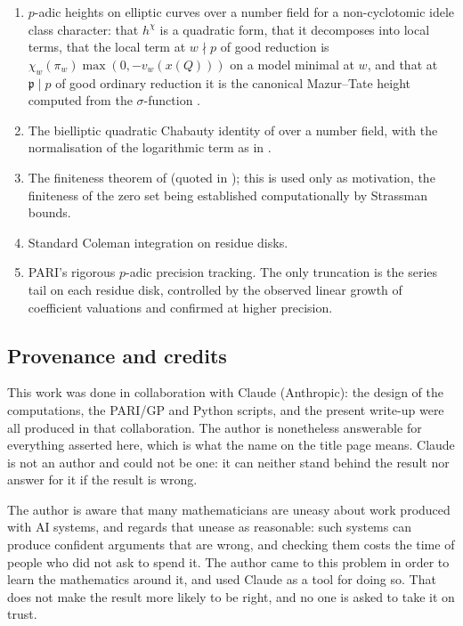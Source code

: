 \documentclass[11pt,reqno]{amsart}
\theoremstyle{plain}
\theoremstyle{definition}
\newcommand{\pp}{\mathfrak{p}}
\numberwithin{equation}{section}
\begin{document}
\begin{enumerate}[label=(\roman*),leftmargin=2.4em]
\item $p$-adic heights on elliptic curves over a number field for a
      non-cyclotomic idele class character: that $h^{\chi}$ is a quadratic form,
      that it decomposes into local terms, that the local term at $w\nmid p$ of
      good reduction is $\chi_{w}(\pi_{w})\max(0,-v_{w}(x(Q)))$ on a model
      minimal at $w$, and that at $\pp\mid p$ of good ordinary reduction it is
      the canonical Mazur--Tate height computed from the $\sigma$-function
      \cite{MazurTate,Bianchi,BBBM}.
\item The bielliptic quadratic Chabauty identity of \cite[Thm.~1.5]{BBBM} over a
      number field, with the normalisation of the logarithmic term as in
      \cite[Thm.~2.3]{BianchiPadurariu}.
\item The finiteness theorem of \cite[Prop.~2]{BDii} (quoted in
      \cite{Dogra}); this is used only as motivation, the finiteness of the
      zero set being established computationally by Strassman bounds.
\item Standard Coleman integration on residue disks.
\item PARI's rigorous $p$-adic precision tracking. The only truncation is the
      series tail on each residue disk, controlled by the observed linear growth
      of coefficient valuations and confirmed at higher precision.
\end{enumerate}

\subsection{Provenance and credits}\label{subsec:status}

This work was done in collaboration with Claude (Anthropic): the design of the
computations, the PARI/GP and Python scripts, and the present write-up were all
produced in that collaboration. The author is nonetheless answerable for
everything asserted here, which is what the name on the title page means.
Claude is not an author and could not be one: it can neither stand behind the
result nor answer for it if the result is wrong.

The author is aware that many mathematicians are uneasy about work produced
with AI systems, and regards that unease as reasonable: such systems can
produce confident arguments that are wrong, and checking them costs the time of
people who did not ask to spend it. The author came to this problem in order to
learn the mathematics around it, and used Claude as a tool for doing so. That
does not make the result more likely to be right, and no one is asked to take
it on trust.
\end{document}
